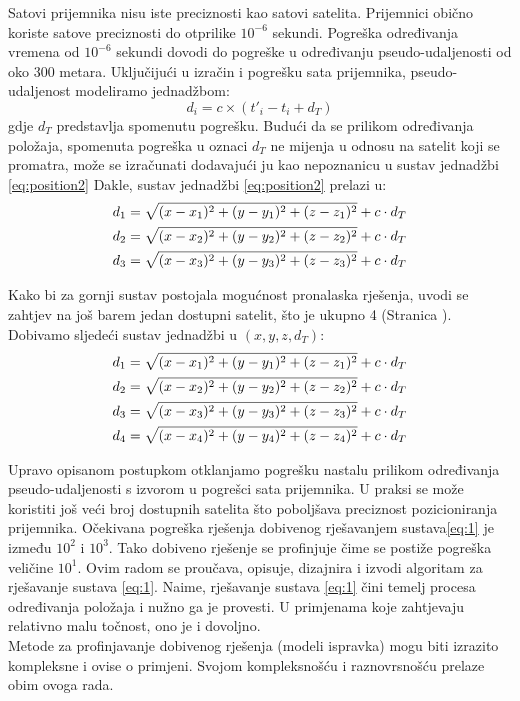 \documentclass[a4paper,twoside,12pt]{memoir} %
\begin{document}
	Satovi prijemnika nisu iste preciznosti kao satovi satelita.
	Prijemnici obično koriste satove preciznosti do otprilike $10^{-6}$ sekundi.
	Pogreška određivanja vremena od $10^{-6}$ sekundi dovodi do pogreške u
	određivanju pseudo-udaljenosti od oko 300 metara.
	Uključijući u izračin i pogrešku sata prijemnika, pseudo-udaljenost modeliramo jednadžbom:
	$$d_i = c\times(t'_i- t_i+ d_T)$$
	gdje $d_T$ predstavlja spomenutu pogrešku.
	Budući da se prilikom određivanja položaja, 
	spomenuta pogreška u oznaci $d_T$ ne mijenja u odnosu na satelit koji se promatra,
	može se izračunati dodavajući ju kao nepoznanicu u sustav jednadžbi \ref{eq:position2}
	Dakle, sustav jednadžbi \ref{eq:position2} prelazi u:
	\begin{align}\label{eq:position3}
	d_1 = \sqrt{(x-x_1)^{2}+(y-y_1)^{2}+(z-z_1)^{2}} + c\cdot d_T \notag \\
	d_2 = \sqrt{(x-x_2)^{2}+(y-y_2)^{2}+(z-z_2)^{2}} + c\cdot d_T  \\
	d_3 = \sqrt{(x-x_3)^{2}+(y-y_3)^{2}+(z-z_3)^{2}} + c\cdot d_T \notag 
	\end{align}
	
	Kako bi za gornji sustav postojala mogućnost pronalaska rješenja,
	uvodi se zahtjev na još barem jedan dostupni satelit, što je ukupno 4 (Stranica \pageref{stranica:4satelita}).
	Dobivamo sljedeći sustav jednadžbi u $(x,y,z,d_T)$:
	\begin{align}\label{eq:1}
	 d_1 = \sqrt{(x-x_1)^{2}+(y-y_1)^{2}+(z-z_1)^{2}} + c\cdot d_T \notag \\
	 d_2 = \sqrt{(x-x_2)^{2}+(y-y_2)^{2}+(z-z_2)^{2}} + c\cdot d_T  \\
	 d_3 = \sqrt{(x-x_3)^{2}+(y-y_3)^{2}+(z-z_3)^{2}} + c\cdot d_T \notag \\
	 d_4 = \sqrt{(x-x_4)^{2}+(y-y_4)^{2}+(z-z_4)^{2}} + c\cdot d_T \notag
	\end{align}
	
	Upravo opisanom postupkom otklanjamo pogrešku nastalu prilikom 
	određivanja pseudo-udaljenosti 
	s izvorom u pogrešci sata prijemnika.
	U praksi se može koristiti još veći broj dostupnih satelita što poboljšava 
	preciznost pozicioniranja prijemnika. Očekivana pogreška rješenja dobivenog rješavanjem sustava\ref{eq:1} je između $10^2$ i $10^3$. Tako dobiveno rješenje se profinjuje čime se postiže pogreška veličine $10^1$.
	Ovim radom se proučava, opisuje, dizajnira i izvodi algoritam za rješavanje sustava \ref{eq:1}.
	Naime, rješavanje sustava \ref{eq:1} čini temelj procesa određivanja položaja i nužno ga je provesti.
	U primjenama koje zahtjevaju relativno malu točnost, ono je i dovoljno.\\
	Metode za profinjavanje dobivenog rješenja (modeli ispravka) mogu biti izrazito kompleksne i ovise o primjeni. Svojom kompleksnošću i raznovrsnošću prelaze obim ovoga rada.\\
\end{document}
